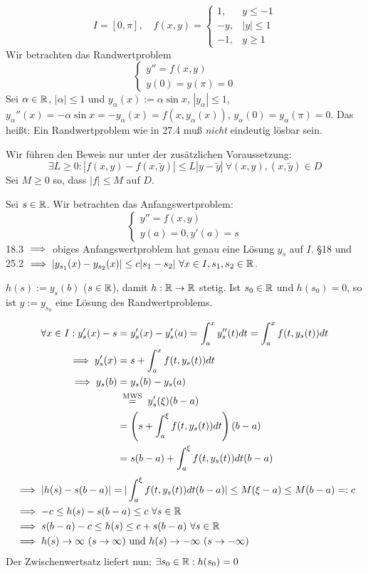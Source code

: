 \documentclass[a4paper,twoside,DIV15,BCOR12mm]{scrbook}
\begin{document}
\begin{beispiel}
\[I = [0,\pi], \quad
f(x,y) = \begin{cases} 1,&y\le -1\\ -y,&|y|\le 1\\ -1,&y\ge 1\end{cases}\]
Wir betrachten das Randwertproblem
\[ \begin{cases} y'' = f(x,y) \\ y(0) = y(\pi) = 0 \end{cases} \]
Sei $\alpha \in \mathbb{R}$, $|\alpha|\le 1$ und $y_\alpha(x) := \alpha \sin x$, $|y_\alpha| \le 1$, $y_\alpha''(x) = - \alpha \sin x = - y_\alpha(x) = f(x,y_\alpha(x))$, $y_\alpha(0) = y_\alpha(\pi) = 0$. Das heißt: Ein Randwertproblem wie in 27.4 muß \emph{nicht} eindeutig lösbar sein.
\end{beispiel}

\begin{beweis}
Wir führen den Beweis nur unter der zusätzlichen Voraussetzung:
\[\exists L \ge 0: |f(x,y) - f(x,\tilde y)| \le L|y-\tilde y| \ \forall(x,y),(x,\tilde y)\in D\]
Sei $M\ge 0$ so, dass $|f|\le M$ auf $D$.

Sei $s\in\mathbb{R}$. Wir betrachten das Anfangswertproblem:
\[ \begin{cases} y'' = f(x,y) \\ y(a) =  0 , y'(a) = s \end{cases} \]
18.3 $\implies$ obiges Anfangswertproblem hat genau eine Lösung $y_s$ auf $I$. §18 und 25.2 $\implies |y_{s_1}(x) - y_{s_2}(x)| \le c |s_1 - s_2 | \ \forall x\in I, s_1,s_2\in \mathbb{R}$.

$h(s) := y_s(b)$ ($s\in\mathbb{R}$), damit $h:\mathbb{R}\to\mathbb{R}$ stetig. Ist $s_0\in\mathbb{R}$ und $h(s_0) = 0$, so ist $y:=y_{s_0}$ eine Lösung des Randwertproblems.

\begin{align*}
\forall x\in I: y_s'(x) - s &= y_s'(x) -y'_s(a) = \int_a^xy_s''(t)dt = \int_a^xf(t,y_s(t))dt\\
\folgt y_s'(x) &= s+ \int_a^x f(t,y_s(t))dt\\
\folgt y_s(b) &= y_s(b) - y_s(a) \\
&\gleichnach{MWS} y_s'(\xi)(b-a) \\
&= \left(s + \int_a^\xi f(t,y_s(t))dt\right)(b-a)\\
&= s(b-a) + \int_a^\xi f(t,y_s(t))dt (b-a) \\
\end{align*}
\begin{align*}
&\folgt |h(s) - s(b-a)| = |\int_a^\xi f(t,y_s(t))dt(b-a)|\le M(\xi - a) \le M(b-a) =: c\\
&\folgt -c \le h(s)-s(b-a) \le c \ \forall s\in\MdR\\
&\folgt s(b-a) -c \le h(s) \le c+s(b-a) \ \forall s\in\MdR\\
&\folgt h(s) \to \infty \ (s\to\infty)\text{ und }h(s) \to -\infty \ (s\to-\infty)
\end{align*}
Der Zwischenwertsatz liefert nun: $\exists s_0 \in\mathbb{R}: h(s_0) = 0$
\end{beweis}
\end{document}
